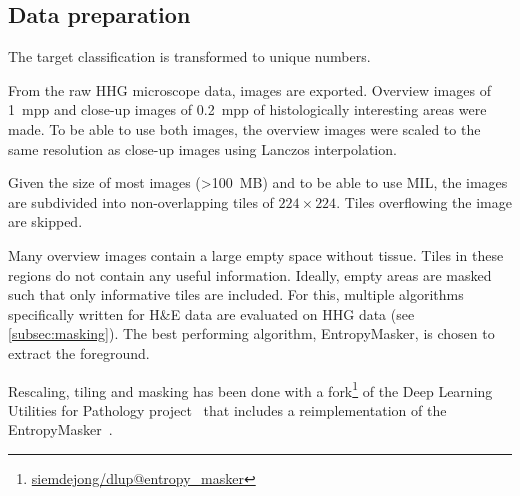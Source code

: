\subsection{Data preparation}

The target classification is transformed to unique numbers.

From the raw HHG microscope data, images are exported.
Overview images of \qty{1}{mpp} and close-up images of \qty{0.2}{mpp} of histologically interesting areas were made.
To be able to use both images, the overview images were scaled to the same resolution as close-up images using Lanczos interpolation.

Given the size of most images (\qty{>100}{MB}) and to be able to use MIL, the images are subdivided into non-overlapping tiles of $224 \times 224$.
Tiles overflowing the image are skipped.

Many overview images contain a large empty space without tissue.
Tiles in these regions do not contain any useful information.
Ideally, empty areas are masked such that only informative tiles are included.
For this, multiple algorithms specifically written for H\&E data are evaluated on HHG data (see \cref{subsec:masking}).
The best performing algorithm, EntropyMasker, is chosen to extract the foreground.

Rescaling, tiling and masking has been done with a fork\footnote{\href{https://github.com/siemdejong/dlup/tree/entropy_masker}{ siemdejong/dlup@entropy\_masker}} of the Deep Learning Utilities for Pathology project~\cite{Teuwen2023} that includes a reimplementation of the EntropyMasker~\cite{Laan2022}.
